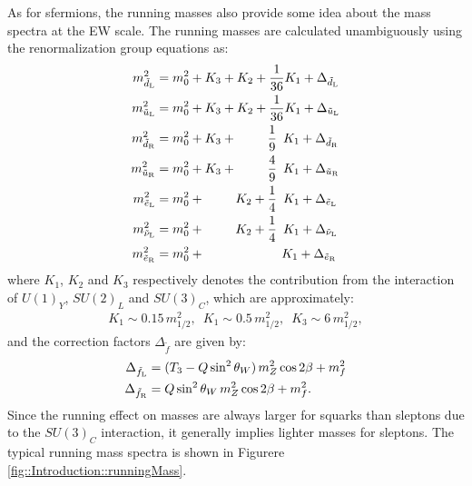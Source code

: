 As for sfermions, the running masses also provide some idea about the mass spectra at the EW scale.
The running masses are calculated unambiguously using the renormalization group equations as:
\begin{align}
m_{\tilde{d}_{\mathrm{L}}}^2   & = m_0^2 + K_3                    + K_2                    + \frac{1}{36} K_1 + \Delta_{\tilde{d}_{\mathrm{L}}}   \nonumber  \\ 
m_{\tilde{u}_{\mathrm{L}}}^2   & = m_0^2 + K_3                    + K_2                    + \frac{1}{36} K_1 + \Delta_{\tilde{u}_{\mathrm{L}}}   \nonumber  \\ 
m_{\tilde{d}_{\mathrm{R}}}^2   & = m_0^2 + K_3                    + \mbox{\phantom{$K_2$ +}} \frac{1}{9} \,\,\,  K_1 +  \Delta_{\tilde{d}_{\mathrm{R}}}   \nonumber  \\ 
m_{\tilde{u}_{\mathrm{R}}}^2   & = m_0^2 + K_3                    + \mbox{\phantom{$K_2$ +}} \frac{4}{9} \,\,\,  K_1 +  \Delta_{\tilde{u}_{\mathrm{R}}}   \nonumber  \\ 
m_{\tilde{e}_{\mathrm{L}}}^2   & = m_0^2 + \mbox{\phantom{$K_3$ +}} K_2                    + \frac{1}{4} \,\,\,  K_1 +  \Delta_{\tilde{e}_{\mathrm{L}}}   \nonumber  \\ 
m_{\tilde{\nu}_{\mathrm{L}}}^2 & = m_0^2 + \mbox{\phantom{$K_3$ +}} K_2                    + \frac{1}{4} \,\,\,  K_1 +  \Delta_{\tilde{\nu}_{\mathrm{L}}} \nonumber  \\ 
m_{\tilde{e}_{\mathrm{R}}}^2   & = m_0^2 + \mbox{\phantom{$K_3$ +}} \mbox{\phantom{$K_2$ +}} \mbox{\phantom{kk}}\, K_1 + \Delta_{\tilde{e}_{\mathrm{R}}}   \nonumber  \\ 
\end{align}
where $K_1$, $K_2$ and $K_3$ respectively denotes the contribution from the interaction of $U(1)_Y$, $SU(2)_L$ and $SU(3)_C$, which are approximately:
\begin{align}
K_1 \sim 0.15 \, m_{1/2}^2, \,\,\, K_1 \sim 0.5 \, m_{1/2}^2, \,\,\, K_3 \sim 6 \, m_{1/2}^2,
\end{align}
and the correction factors $\Delta_{\tilde{f}}$ are given by:
\begin{align}
\Delta_{\tilde{f}_\mathrm{L}} & = (T_3-Q\sin^2{\theta_W}) \, m_Z^2 \cos{2\beta} + m_f^2   \nonumber \\
\Delta_{\tilde{f}_\mathrm{R}} & = Q\sin^2{\theta_W} \, m_Z^2 \cos{2\beta} + m_f^2.   \nonumber \\
\end{align}
Since the running effect on masses are always larger for squarks than sleptons due to the $SU(3)_C$ interaction, 
it generally implies lighter masses for sleptons.
The typical running mass spectra is shown in Figurere \ref{fig::Introduction::runningMass}. \\

